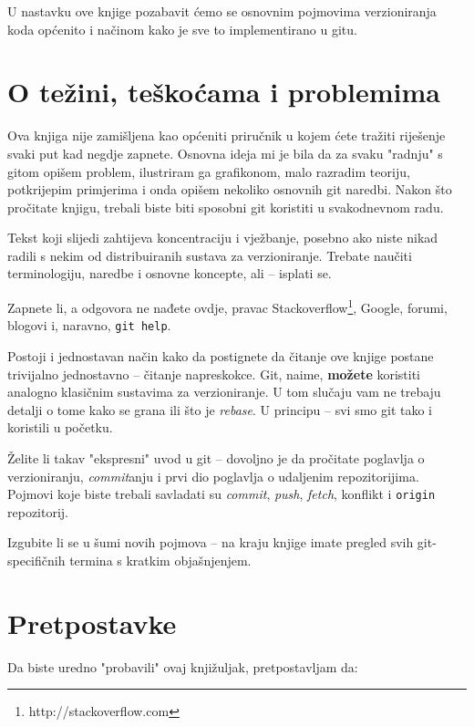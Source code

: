 U nastavku ove knjige pozabavit ćemo se osnovnim pojmovima verzioniranja koda općenito i načinom kako je sve to implementirano u gitu.

\section*{O težini, teškoćama i problemima}

Ova knjiga nije zamišljena kao općeniti priručnik u kojem ćete tražiti riješenje svaki put kad negdje zapnete.
Osnovna ideja mi je bila da za svaku "radnju" s gitom opišem problem, ilustriram ga grafikonom, malo razradim teoriju, potkrijepim primjerima i onda opišem nekoliko osnovnih git naredbi.
Nakon što pročitate knjigu, trebali biste biti sposobni git koristiti u svakodnevnom radu. 

Tekst koji slijedi zahtijeva koncentraciju i vježbanje, posebno ako niste nikad radili s nekim od distribuiranih sustava za verzioniranje.
Trebate naučiti terminologiju, naredbe i osnovne koncepte, ali -- isplati se.

Zapnete li, a odgovora ne nađete ovdje, pravac Stackoverflow\footnote{http://stackoverflow.com}, Google, 
forumi, blogovi i, naravno, \verb+git help+.

Postoji i jednostavan način kako da postignete da čitanje ove knjige postane trivijalno jednostavno -- čitanje napreskokce.
Git, naime, \textbf{možete} koristiti analogno klasičnim sustavima za verzioniranje. 
U tom slučaju vam ne trebaju detalji o tome kako se grana ili što je \emph{rebase}.
U principu -- svi smo git tako i koristili u početku.

Želite li takav "ekspresni" uvod u git -- dovoljno je da pročitate poglavlja o verzioniranju, \emph{commit}anju i prvi dio poglavlja o udaljenim repozitorijima.
Pojmovi koje biste trebali savladati su \emph{commit}, \emph{push}, \emph{fetch}, konflikt i \verb+origin+ repozitorij.

Izgubite li se u šumi novih pojmova -- na kraju knjige imate pregled svih git-specifičnih termina s kratkim objašnjenjem.

\section*{Pretpostavke}

Da biste uredno "probavili" ovaj knjižuljak, pretpostavljam da:

